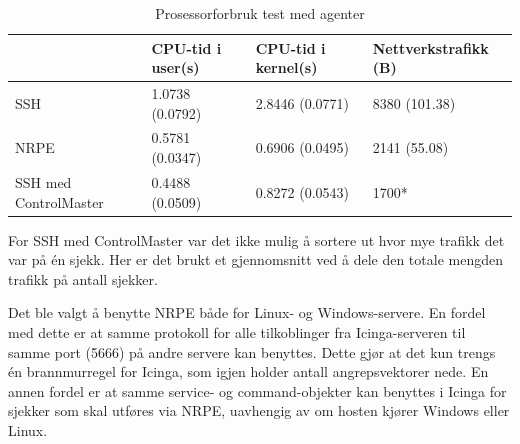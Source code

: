 \begin{table}
    \begin{center}
	\begin{threeparttable}
    \begin{tabular}{| l | l | l | l |} \hline
	\ & \textbf{CPU-tid i user(s)} & \textbf{CPU-tid i kernel(s)} & \textbf{Nettverkstrafikk (B)} \\ \hline
	SSH & 1.0738 (0.0792) & 2.8446 (0.0771) & 8380 (101.38) \\ \hline
	NRPE & 0.5781 (0.0347) & 0.6906 (0.0495) & 2141 (55.08) \\ \hline
	SSH med ControlMaster & 0.4488 (0.0509) & 0.8272 (0.0543) & 1700* \\ \hline
	\end{tabular}
	\begin{tablenotes}
	\small
	\item *For SSH med ControlMaster var det ikke mulig å sortere ut hvor mye trafikk det var på én sjekk. Her er det brukt et gjennomsnitt ved å dele den totale mengden trafikk på antall sjekker.
	\end{tablenotes}
	\caption{Prosessorforbruk test med agenter}
	\label{agentcheck}
	\end{threeparttable}
	\end{center}
\end{table}

Det ble valgt å benytte NRPE både for Linux- og Windows-servere. En fordel med dette er at samme protokoll for alle tilkoblinger fra Icinga-serveren til samme port (5666) på andre servere kan benyttes. Dette gjør at det kun trengs én brannmurregel for Icinga, som igjen holder antall angrepsvektorer nede. En annen fordel er at samme service- og command-objekter kan benyttes i Icinga for sjekker som skal utføres via NRPE, uavhengig av om hosten kjører Windows eller Linux.
